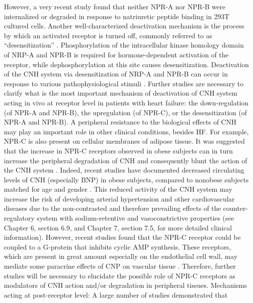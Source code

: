 \documentclass[14pt,a4paper,onecolumn]{extarticle}
\begin{document}
However, a very recent study \citep{bib348} found that neither NPR-A nor NPR-B were internalized or degraded in response to natriuretic peptide binding in 293T cultured cells.
Another well-characterized deactivation mechanism is the process by which an activated
receptor is turned off, commonly referred to as “desensitization” \citep{bib348} \citep{bib349} \citep{bib350}. Phosphorylation
of the intracellular kinase homology domain of NRP-A and NPR-B is required for hormone-dependent activation of the receptor, while dephosphorylation at this site causes desensitization. Deactivation of the CNH system via desensitization of NRP-A and
NPR-B can occur in response to various pathophysiological stimuli \citep{bib348} \citep{bib349} \citep{bib350} .
Further studies are necessary to clarify what is the most important mechanism of
deactivation of CNH system acting in vivo at receptor level in patients with heart failure: the down-regulation (of NPR-A and NPR-B), the upregulation (of NPR-C), or the
desensitization (of NPR-A and NPR-B).
A peripheral resistance to the biological effects of CNH may play an important role in
other clinical conditions, besides HF. For example, NPR-C is also present on cellular membranes of adipose tissue. It was suggested that the increase in NPR-C receptors observed
in obese subjects can in turn increase the peripheral degradation of CNH and consequently
blunt the action of the CNH system \citep{bib351} \citep{bib352}. Indeed, recent studies have documented
decreased circulating levels of CNH (especially BNP) in obese subjects, compared to nonobese subjects matched for age and gender \citep{bib351} \citep{bib354}. This reduced activity of the CNH system may increase the risk of developing arterial hypertension and other cardiovascular
diseases due to the non-contrasted and therefore prevailing effects of the counter-regulatory system with sodium-retentive and vasoconstrictive properties \citep{bib352} \citep{bib353} \citep{bib354} (see Chapter
6, section 6.9, and Chapter 7, section 7.5, for more detailed clinical information).
However, recent studies found that the NPR-C receptor could be coupled to a G-protein that inhibits cyclic AMP synthesis. These receptors, which are present in great
amount especially on the endothelial cell wall, may mediate some paracrine effects of
CNP on vascular tissue \citep{bib355} \citep{bib356} \citep{bib357}. Therefore, further studies will be necessary to elucidate the possible role of NPR-C receptors as modulators of CNH action and/or degradation in peripheral tissues.
Mechanisms acting at post-receptor level: A large number of studies demonstrated that
\end{document}
